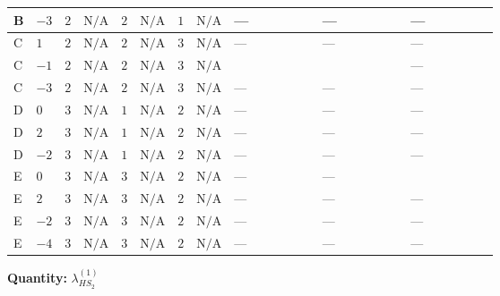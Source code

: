 \documentclass[8pt]{article}
\begin{document}
\begin{landscape}
\begin{longtable}{@{}llcccccc >{\raggedright\arraybackslash}p{0.21\linewidth} >{\raggedright\arraybackslash}p{0.21\linewidth} >{\raggedright\arraybackslash}p{0.21\linewidth}@{}}
\midrule
B & $-3$ & $2$ & $\text{N/A}$ & $2$ & $\text{N/A}$ & $1$ & $\text{N/A}$ & --- & --- & --- \\
\midrule
C & $1$ & $2$ & $\text{N/A}$ & $2$ & $\text{N/A}$ & $3$ & $\text{N/A}$ & --- & --- & --- \\
\midrule
C & $-1$ & $2$ & $\text{N/A}$ & $2$ & $\text{N/A}$ & $3$ & $\text{N/A}$ & \scriptsize\adjustbox{max width=\linewidth}{$\begin{gathered} +{\lambda_{X_{17}}^{(1)}} (2 \left({\lambda_{H H^\dagger S_1^\dagger S_2^\dagger}^{\rm Cross}}\right)^{*}-3 \left({\lambda_{10}}\right)^{*}+4 \left({\lambda_{X_{17}}^{(1)}}\right)^{*})\end{gathered}$} & \scriptsize\adjustbox{max width=\linewidth}{$\begin{gathered} +24 {\lambda_{8}} \left({\lambda_{8}}\right)^{*}\end{gathered}$} & --- \\
\midrule
C & $-3$ & $2$ & $\text{N/A}$ & $2$ & $\text{N/A}$ & $3$ & $\text{N/A}$ & --- & --- & --- \\
\midrule
D & $0$ & $3$ & $\text{N/A}$ & $1$ & $\text{N/A}$ & $2$ & $\text{N/A}$ & --- & --- & --- \\
\midrule
D & $2$ & $3$ & $\text{N/A}$ & $1$ & $\text{N/A}$ & $2$ & $\text{N/A}$ & --- & --- & --- \\
\midrule
D & $-2$ & $3$ & $\text{N/A}$ & $1$ & $\text{N/A}$ & $2$ & $\text{N/A}$ & --- & --- & --- \\
\midrule
E & $0$ & $3$ & $\text{N/A}$ & $3$ & $\text{N/A}$ & $2$ & $\text{N/A}$ & --- & --- & \scriptsize\adjustbox{max width=\linewidth}{$\begin{gathered} +4 {\lambda_{X_{18}}} (3 \left({\lambda_{X_{5}}^{(1)}}\right)^{*}+\left({\lambda_{X_{5}}^{(2)}}\right)^{*})\end{gathered}$} \\
\midrule
E & $2$ & $3$ & $\text{N/A}$ & $3$ & $\text{N/A}$ & $2$ & $\text{N/A}$ & --- & --- & --- \\
\midrule
E & $-2$ & $3$ & $\text{N/A}$ & $3$ & $\text{N/A}$ & $2$ & $\text{N/A}$ & --- & --- & --- \\
\midrule
E & $-4$ & $3$ & $\text{N/A}$ & $3$ & $\text{N/A}$ & $2$ & $\text{N/A}$ & --- & --- & --- \\
\midrule
\bottomrule
\end{longtable}
\clearpage
\noindent\textbf{Quantity: }$\lambda_{HS_2}^{(1)}$\par\smallskip

\end{landscape}
\end{document}
